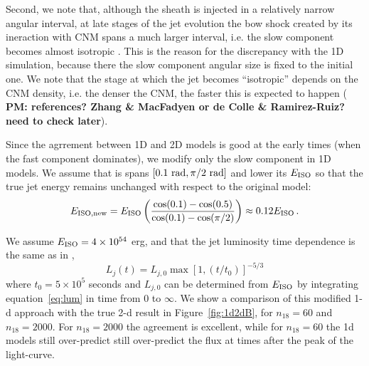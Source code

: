 \documentclass[usenatbib,fleqn]{mnras}
\begin{document}
Second, we note that, although the sheath is injected in a relatively
narrow angular interval, at late stages of the jet evolution the bow
shock created by its ineraction with CNM spans a much larger interval,
i.e. the slow component becomes almost isotropic \citep[bottom two
panels in Fig. 8 in][]{Mimica+2015}. This is the reason for the
discrepancy with the 1D simulation, because there the slow component
angular size is fixed to the initial one. We note that the stage at
which the jet becomes ``isotropic'' depends on the CNM density,
i.e. the denser the CNM, the faster this is expected to happen ({\bf
  PM: references? Zhang \& MacFadyen or de Colle \& Ramirez-Ruiz? need
  to check later}).

Since the agrrement between 1D and 2D models is good at the early
times (when the fast component dominates), we modify only the slow
component in 1D models. We assume that is spans $[0.1\ {\rm rad},
\pi/2\ {\rm rad}]$ and lower its $E_{\rm ISO}$ so that the true jet
energy remains unchanged with respect to the original model:
\begin{equation}\label{eq:Eiso}
 E_{\rm ISO, new} = E_{\rm ISO} \left(\frac{\cos(0.1) - \cos(0.5)}{\cos(0.1) - \cos(\pi/2)}\right)\approx 0.12 E_{\rm ISO}\, .
\end{equation}

We assume $E_{\rm ISO} = 4\times 10^{54}$ erg, and that the jet luminosity time dependence is the same as in \citet{Mimica+2015},
\begin{equation}\label{eq:lum}
L_j(t) = L_{j,0}\max\left[1, (t/t_0)\right]^{-5/3}
\end{equation}
where $t_0 = 5\times 10^5$ seconds and $L_{j, 0}$ can be determined
from $E_{\rm ISO}$ by integrating equation~\ref{eq:lum} in time from
$0$ to $\infty$. We show a comparison of this modified 1-d approach
with the true 2-d result in Figure~\ref{fig:1d2dB}, for $n_{18}=60$
and $n_{18}=2000$. For $n_{18}=2000$ the agreement is excellent, while
for $n_{18}=60$ the 1d models still over-predict still over-predict
the flux at times after the peak of the light-curve.
\end{document}
